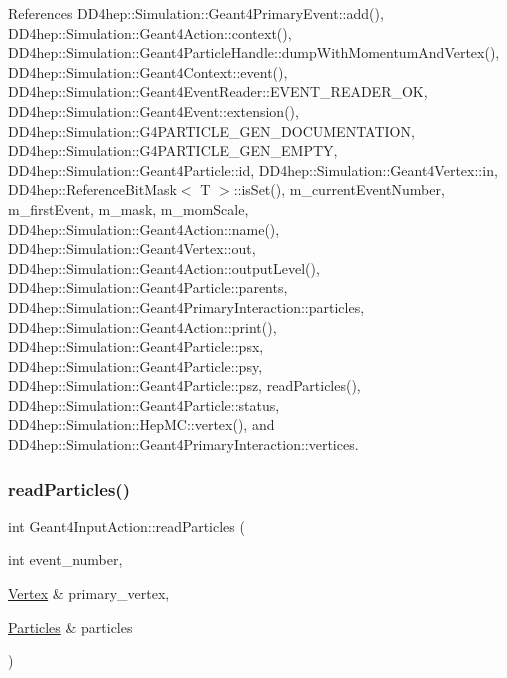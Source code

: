 References D\+D4hep\+::\+Simulation\+::\+Geant4\+Primary\+Event\+::add(), D\+D4hep\+::\+Simulation\+::\+Geant4\+Action\+::context(), D\+D4hep\+::\+Simulation\+::\+Geant4\+Particle\+Handle\+::dump\+With\+Momentum\+And\+Vertex(), D\+D4hep\+::\+Simulation\+::\+Geant4\+Context\+::event(), D\+D4hep\+::\+Simulation\+::\+Geant4\+Event\+Reader\+::\+E\+V\+E\+N\+T\+\_\+\+R\+E\+A\+D\+E\+R\+\_\+\+OK, D\+D4hep\+::\+Simulation\+::\+Geant4\+Event\+::extension(), D\+D4hep\+::\+Simulation\+::\+G4\+P\+A\+R\+T\+I\+C\+L\+E\+\_\+\+G\+E\+N\+\_\+\+D\+O\+C\+U\+M\+E\+N\+T\+A\+T\+I\+ON, D\+D4hep\+::\+Simulation\+::\+G4\+P\+A\+R\+T\+I\+C\+L\+E\+\_\+\+G\+E\+N\+\_\+\+E\+M\+P\+TY, D\+D4hep\+::\+Simulation\+::\+Geant4\+Particle\+::id, D\+D4hep\+::\+Simulation\+::\+Geant4\+Vertex\+::in, D\+D4hep\+::\+Reference\+Bit\+Mask$<$ T $>$\+::is\+Set(), m\+\_\+current\+Event\+Number, m\+\_\+first\+Event, m\+\_\+mask, m\+\_\+mom\+Scale, D\+D4hep\+::\+Simulation\+::\+Geant4\+Action\+::name(), D\+D4hep\+::\+Simulation\+::\+Geant4\+Vertex\+::out, D\+D4hep\+::\+Simulation\+::\+Geant4\+Action\+::output\+Level(), D\+D4hep\+::\+Simulation\+::\+Geant4\+Particle\+::parents, D\+D4hep\+::\+Simulation\+::\+Geant4\+Primary\+Interaction\+::particles, D\+D4hep\+::\+Simulation\+::\+Geant4\+Action\+::print(), D\+D4hep\+::\+Simulation\+::\+Geant4\+Particle\+::psx, D\+D4hep\+::\+Simulation\+::\+Geant4\+Particle\+::psy, D\+D4hep\+::\+Simulation\+::\+Geant4\+Particle\+::psz, read\+Particles(), D\+D4hep\+::\+Simulation\+::\+Geant4\+Particle\+::status, D\+D4hep\+::\+Simulation\+::\+Hep\+M\+C\+::vertex(), and D\+D4hep\+::\+Simulation\+::\+Geant4\+Primary\+Interaction\+::vertices.

\hypertarget{class_d_d4hep_1_1_simulation_1_1_geant4_input_action_acaa33515bc305aacd8c6ad5f8c2f0b0c}{}\label{class_d_d4hep_1_1_simulation_1_1_geant4_input_action_acaa33515bc305aacd8c6ad5f8c2f0b0c} 
\subsubsection{\texorpdfstring{read\+Particles()}{readParticles()}}
{\footnotesize\ttfamily int Geant4\+Input\+Action\+::read\+Particles (\begin{DoxyParamCaption}\item[{int}]{event\+\_\+number,  }\item[{\hyperlink{class_d_d4hep_1_1_simulation_1_1_geant4_input_action_a0bcc23935dc55574b02d9ee4514eabc8}{Vertex} \&}]{primary\+\_\+vertex,  }\item[{\hyperlink{class_d_d4hep_1_1_simulation_1_1_geant4_input_action_ae62b1f5e1be390991dd228e7bb7bcc04}{Particles} \&}]{particles }\end{DoxyParamCaption})}



